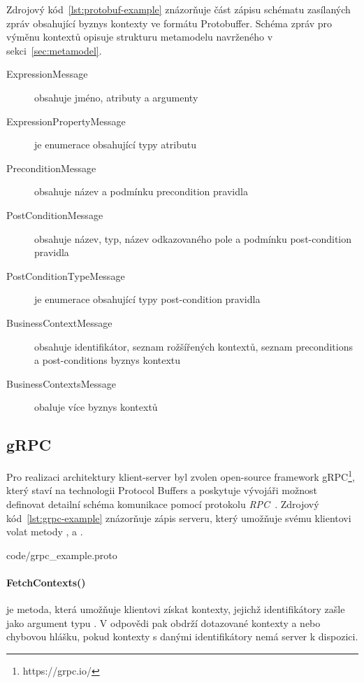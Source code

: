 Zdrojový kód~\ref{lst:protobuf-example} znázorňuje část zápisu schématu
zasílaných zpráv obsahující byznys kontexty ve formátu Protobuffer.
Schéma zpráv pro výměnu kontextů opisuje strukturu metamodelu navrženého
v sekci~\ref{sec:metamodel}.

\begin{description}
    \item [ExpressionMessage] obsahuje jméno, atributy a argumenty 
    \item [ExpressionPropertyMessage] je enumerace obsahující typy atributu 
    \item [PreconditionMessage] obsahuje název a podmínku precondition pravidla
    \item [PostConditionMessage] obsahuje název, typ, název odkazovaného pole a podmínku post-condition pravidla
    \item [PostConditionTypeMessage] je enumerace obsahující typy post-condition pravidla
    \item [BusinessContextMessage] obsahuje identifikátor, seznam rožšířených kontextů, seznam preconditions a post-conditions byznys kontextu
    \item [BusinessContextsMessage] obaluje více byznys kontextů
\end{description}

\subsection{gRPC}

Pro realizaci architektury klient-server byl zvolen
open-source framework gRPC\footnote{https://grpc.io/}, který staví
na technologii Protocol Buffers a poskytuje vývojáři
možnost definovat detailní schéma komunikace pomocí
protokolu \textit{RPC}~\cite{nelson1981remote}.
Zdrojový kód~\ref{lst:grpc-example} znázorňuje zápis serveru,
který umožňuje svému klientovi volat metody ,
 a .


{code/grpc_example.proto}

\paragraph{FetchContexts()} je metoda, která umožňuje klientovi
získat kontexty, jejichž identifikátory zašle jako argument
typu .
V odpovědi pak obdrží dotazované kontexty a nebo chybovou hlášku,
pokud kontexty s danými identifikátory nemá server k dispozici.

